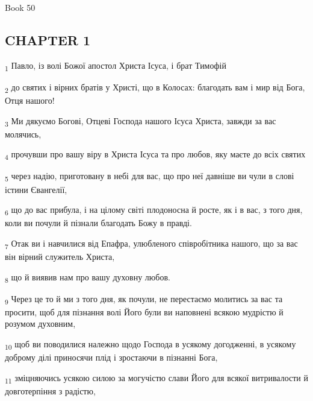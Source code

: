 Book 50
\subsection{CHAPTER 1}
\begin{tcolorbox}
\textsubscript{1} Павло, із волі Божої апостол Христа Ісуса, і брат Тимофій
\end{tcolorbox}
\begin{tcolorbox}
\textsubscript{2} до святих і вірних братів у Христі, що в Колосах: благодать вам і мир від Бога, Отця нашого!
\end{tcolorbox}
\begin{tcolorbox}
\textsubscript{3} Ми дякуємо Богові, Отцеві Господа нашого Ісуса Христа, завжди за вас молячись,
\end{tcolorbox}
\begin{tcolorbox}
\textsubscript{4} прочувши про вашу віру в Христа Ісуса та про любов, яку маєте до всіх святих
\end{tcolorbox}
\begin{tcolorbox}
\textsubscript{5} через надію, приготовану в небі для вас, що про неї давніше ви чули в слові істини Євангелії,
\end{tcolorbox}
\begin{tcolorbox}
\textsubscript{6} що до вас прибула, і на цілому світі плодоносна й росте, як і в вас, з того дня, коли ви почули й пізнали благодать Божу в правді.
\end{tcolorbox}
\begin{tcolorbox}
\textsubscript{7} Отак ви і навчилися від Епафра, улюбленого співробітника нашого, що за вас він вірний служитель Христа,
\end{tcolorbox}
\begin{tcolorbox}
\textsubscript{8} що й виявив нам про вашу духовну любов.
\end{tcolorbox}
\begin{tcolorbox}
\textsubscript{9} Через це то й ми з того дня, як почули, не перестаємо молитись за вас та просити, щоб для пізнання волі Його були ви наповнені всякою мудрістю й розумом духовним,
\end{tcolorbox}
\begin{tcolorbox}
\textsubscript{10} щоб ви поводилися належно щодо Господа в усякому догодженні, в усякому доброму ділі приносячи плід і зростаючи в пізнанні Бога,
\end{tcolorbox}
\begin{tcolorbox}
\textsubscript{11} зміцняючись усякою силою за могучістю слави Його для всякої витривалости й довготерпіння з радістю,
\end{tcolorbox}
